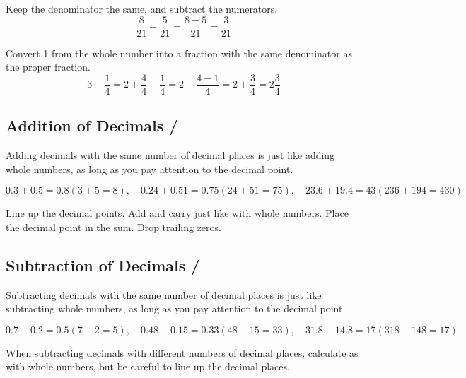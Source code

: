 Keep the denominator the same, and subtract the numerators.  
\[
\dfrac{8}{21} - \dfrac{5}{21} 
= \dfrac{8-5}{21} 
= \dfrac{3}{21}
\]


Convert 1 from the whole number into a fraction with the same denominator as the proper fraction.  
\[
3 - \dfrac{1}{4} 
= 2 + \dfrac{4}{4} - \dfrac{1}{4} 
= 2 + \dfrac{4-1}{4} 
= 2 + \dfrac{3}{4} 
= 2 \dfrac{3}{4}
\]


\subsection*{Addition of Decimals / }

Adding decimals with the same number of decimal places is just like adding whole numbers, as long as you pay attention to the decimal point.

\[
0.3 + 0.5 = 0.8 (3 + 5 = 8), \quad 0.24 + 0.51 = 0.75 (24 + 51 = 75), \quad 23.6 + 19.4 = 43 (236 + 194 = 430)
\]


Line up the decimal points. Add and carry just like with whole numbers. Place the decimal point in the sum. Drop trailing zeros.

\subsection*{Subtraction of Decimals / }

Subtracting decimals with the same number of decimal places is just like subtracting whole numbers, as long as you pay attention to the decimal point.  

\[
0.7 - 0.2 = 0.5 (7 - 2 = 5), \quad 0.48 - 0.15 = 0.33 (48 - 15 = 33), \quad 31.8 - 14.8 = 17 (318 - 148 = 17)
\]


When subtracting decimals with different numbers of decimal places, calculate as with whole numbers, but be careful to line up the decimal places.  

